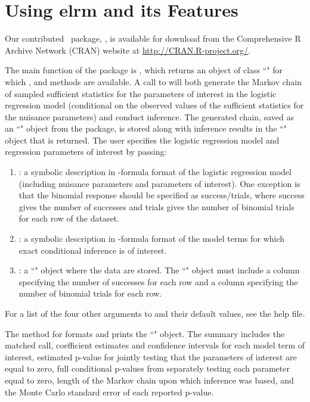 \documentclass[article, shortnames]{jss}
\begin{document}
\section{Using elrm and its Features} \label{Using elrm and its features}

Our contributed \ package, , is available
for download from the Comprehensive R Archive Network (CRAN)
website at \url{http://CRAN.R-project.org/}.

The main function of the  package is ,
which returns an object of class ``" for which
,  and  methods are
available. A call to  will both generate the Markov
chain of sampled sufficient statistics for the parameters of
interest in the logistic regression model (conditional on the
observed values of the sufficient statistics for the nuisance
parameters) and conduct inference. The generated chain, saved as
an ``" object from the  package, is stored
along with inference results in the ``" object that is
returned. The user specifies the logistic regression model and
regression parameters of interest by passing:

\begin{enumerate}

\item {}: a symbolic description in
-formula format of the logistic regression model
(including nuisance parameters and parameters of interest). One
exception is that the binomial response should be specified as
success/trials, where success gives the number of successes and
trials gives the number of binomial trials for each row of the
dataset.

\item {}: a symbolic description in
-formula format of the model terms for which exact
conditional inference is of interest.

\item {}: a ``" object where the data
are stored. The ``" object must include a column
specifying the number of successes for each row and a column
specifying the number of binomial trials for each row.

\end{enumerate}
For a list of the four other arguments to  and their
default values, see the help file.

The  method for  formats and prints the
``" object. The summary includes the matched call,
coefficient estimates and confidence intervals for each model term
of interest, estimated p-value for jointly testing that the
parameters of interest are equal to zero, full conditional
p-values from separately testing each parameter equal to zero,
length of the Markov chain upon which inference was based, and the
Monte Carlo standard error of each reported p-value.
\end{document}
